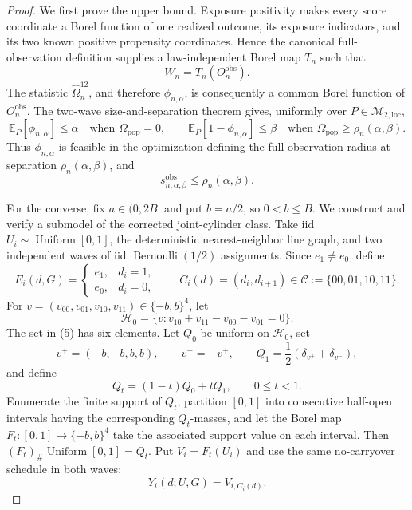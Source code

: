 \documentclass{article}
\begin{document}
\begin{proof}
We first prove the upper bound.  Exposure positivity makes every score coordinate a Borel function of one realized outcome, its exposure indicators, and its two known positive propensity coordinates.  Hence the canonical full-observation definition supplies a law-independent Borel map \(T_n\) such that
\[
 W_n=T_n(O_n^{\mathrm{obs}}). \tag{1}
\]
The statistic \(\widehat\Omega_n^{12}\), and therefore \(\phi_{n,\alpha}\), is consequently a common Borel function of \(O_n^{\mathrm{obs}}\).  The two-wave size-and-separation theorem gives, uniformly over \(P\in\mathcal M_{2,\mathrm{loc}}\),
\[
 \mathbb E_P[\phi_{n,\alpha}]\le\alpha
 \quad\text{when }\Omega_{\mathrm{pop}}=0,
 \qquad
 \mathbb E_P[1-\phi_{n,\alpha}]\le\beta
 \quad\text{when }\Omega_{\mathrm{pop}}\ge\rho_n(\alpha,\beta). \tag{2}
\]
Thus \(\phi_{n,\alpha}\) is feasible in the optimization defining the full-observation radius at separation \(\rho_n(\alpha,\beta)\), and
\[
 s_{n,\alpha,\beta}^{\mathrm{obs}}
 \le\rho_n(\alpha,\beta). \tag{3}
\]

For the converse, fix \(a\in(0,2B]\) and put \(b=a/2\), so \(0<b\le B\).  We construct and verify a submodel of the corrected joint-cylinder class.  Take iid \(U_i\sim\operatorname{Uniform}[0,1]\), the deterministic nearest-neighbor line graph, and two independent waves of iid \(\operatorname{Bernoulli}(1/2)\) assignments.  Since \(e_1\ne e_0\), define
\[
 E_i(d,G)=
 \begin{cases}
  e_1,&d_i=1,\\
  e_0,&d_i=0,
 \end{cases}
 \qquad
 C_i(d)=(d_i,d_{i+1})
 \in\mathcal C:=\{00,01,10,11\}. \tag{4}
\]
For \(v=(v_{00},v_{01},v_{10},v_{11})\in\{-b,b\}^4\), let
\[
 \mathcal H_0
 =\{v:v_{10}+v_{11}-v_{00}-v_{01}=0\}. \tag{5}
\]
The set in (5) has six elements.  Let \(Q_0\) be uniform on \(\mathcal H_0\), set
\[
 v^+=(-b,-b,b,b),
 \qquad v^-=-v^+,
 \qquad Q_1=\frac12(\delta_{v^+}+\delta_{v^-}),
\]
and define
\[
 Q_t=(1-t)Q_0+tQ_1,
 \qquad 0\le t<1. \tag{6}
\]
Enumerate the finite support of \(Q_t\), partition \([0,1]\) into consecutive half-open intervals having the corresponding \(Q_t\)-masses, and let the Borel map \(F_t:[0,1]\to\{-b,b\}^4\) take the associated support value on each interval.  Then \((F_t)_\#\operatorname{Uniform}[0,1]=Q_t\).  Put \(V_i=F_t(U_i)\) and use the same no-carryover schedule in both waves:
\[
 Y_i(d;U,G)=V_{i,C_i(d)}. \tag{7}
\]


\end{proof}
\end{document}
